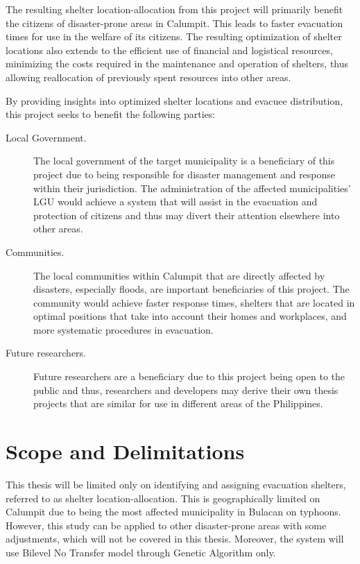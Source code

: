 	The resulting shelter location-allocation from this project will primarily benefit the citizens of disaster-prone areas in Calumpit. This leads to faster evacuation times for use in the welfare of its citizens. The resulting optimization of shelter locations also extends to the efficient use of financial and logistical resources, minimizing the costs required in the maintenance and operation of shelters, thus allowing reallocation of previously spent resources into other areas.
	
	By providing insights into optimized shelter locations and evacuee distribution, this project seeks to benefit the following parties:
	
	\begin{description}
		\item[Local Government.] The local government of the target municipality is a beneficiary of this project due to being responsible for disaster management and response within their jurisdiction. The administration of the affected municipalities’ LGU would achieve a system that will assist in the evacuation and protection of citizens and thus may divert their attention elsewhere into other areas.
		
		\item[Communities.] The local communities within Calumpit that are directly affected by disasters, especially floods, are important beneficiaries of this project. The community would achieve faster response times, shelters that are located in optimal positions that take into account their homes and workplaces, and more systematic procedures in evacuation.
		
		\item[Future researchers.] Future researchers are a beneficiary due to this project being open to the public and thus, researchers and developers may derive their own thesis projects that are similar for use in different areas of the Philippines.
		
	\end{description}

\section{Scope and Delimitations}
	This thesis will be limited only on identifying and assigning evacuation shelters, referred to as shelter location-allocation. This is geographically limited on Calumpit due to being the most affected municipality in Bulacan on typhoons. However, this study can be applied to other disaster-prone areas with some adjustments, which will not be covered in this thesis. Moreover, the system will use Bilevel No Transfer model through Genetic Algorithm only.
	
